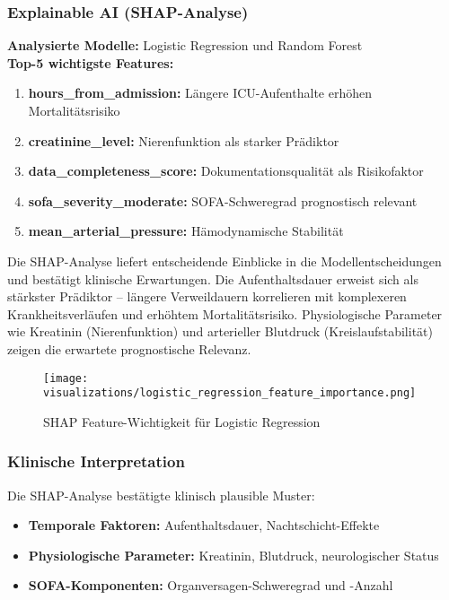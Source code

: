 \documentclass[12pt]{article}
\begin{document}
\subsubsection{Explainable AI (SHAP-Analyse)}
\textbf{Analysierte Modelle:} Logistic Regression und Random Forest\\
\textbf{Top-5 wichtigste Features:}
\begin{enumerate}
    \item \textbf{hours\_from\_admission:} Längere ICU-Aufenthalte erhöhen Mortalitätsrisiko
    \item \textbf{creatinine\_level:} Nierenfunktion als starker Prädiktor
    \item \textbf{data\_completeness\_score:} Dokumentationsqualität als Risikofaktor
    \item \textbf{sofa\_severity\_moderate:} SOFA-Schweregrad prognostisch relevant
    \item \textbf{mean\_arterial\_pressure:} Hämodynamische Stabilität
\end{enumerate}

Die SHAP-Analyse liefert entscheidende Einblicke in die Modellentscheidungen und bestätigt klinische Erwartungen. Die Aufenthaltsdauer erweist sich als stärkster Prädiktor – längere Verweildauern korrelieren mit komplexeren Krankheitsverläufen und erhöhtem Mortalitätsrisiko. Physiologische Parameter wie Kreatinin (Nierenfunktion) und arterieller Blutdruck (Kreislaufstabilität) zeigen die erwartete prognostische Relevanz.

\begin{figure}[H]
\centering
\texttt{[image: visualizations/logistic\_regression\_feature\_importance.png]}
\caption{SHAP Feature-Wichtigkeit für Logistic Regression}
\label{fig:shap_importance}
\end{figure}



\subsubsection{Klinische Interpretation}
Die SHAP-Analyse bestätigte klinisch plausible Muster:
\begin{itemize}
    \item \textbf{Temporale Faktoren:} Aufenthaltsdauer, Nachtschicht-Effekte
    \item \textbf{Physiologische Parameter:} Kreatinin, Blutdruck, neurologischer Status
    \item \textbf{SOFA-Komponenten:} Organversagen-Schweregrad und -Anzahl
\end{itemize}
\end{document}
